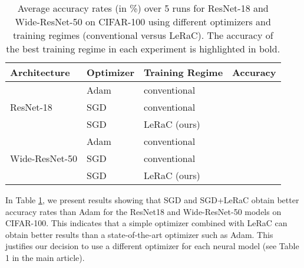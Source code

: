 \documentclass[10pt,twocolumn,letterpaper]{article}
\begin{document}
\begin{table}[t]
  \small{
  \setlength\tabcolsep{3.3pt}
  \begin{center}
  \begin{tabular}{lllc}
    \toprule
    Architecture  & Optimizer& Training Regime     & Accuracy \\
    \midrule
     \multirow{3}{*}{ResNet-18} & Adam & conventional             &  \\
                                & SGD & conventional             &  \\
                                & SGD & LeRaC (ours)              & \\
    \midrule
    \multirow{3}{*}{Wide-ResNet-50} & Adam  & conventional             &  \\
                                    & SGD   & conventional             &  \\
                                    & SGD   & LeRaC (ours)              & \\
    \bottomrule
  \end{tabular}
    \end{center}
    }
      \vspace{-0.6cm}
    \caption{Average accuracy rates (in \%) over 5 runs for ResNet-18 and Wide-ResNet-50 on CIFAR-100 using different optimizers and training regimes (conventional versus LeRaC). The accuracy of the best training regime in each experiment is highlighted in bold.}
  \label{tab_optimizer}
\end{table}

In Table \ref{tab_optimizer}, we present results showing that SGD and SGD+LeRaC obtain better accuracy rates than Adam \cite{Kingma-ICLR-1015} for the ResNet18 and Wide-ResNet-50 models on CIFAR-100. This indicates that a simple optimizer combined with LeRaC can obtain better results than a state-of-the-art optimizer such as Adam. This justifies our decision to use a different optimizer for each neural model (see Table 1 in the main article).
\end{document}
